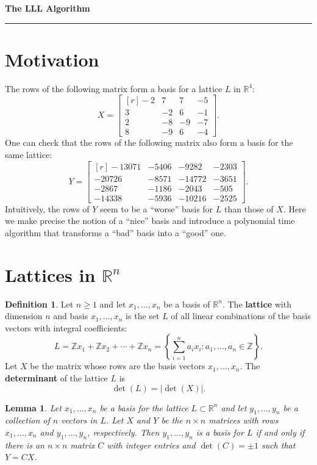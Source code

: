 \documentclass[11pt,letterpaper]{article}
\newcommand{\integers}{\mathbb{Z}}
\newcommand{\reals}{\mathbb{R}}
\newtheorem{lemma}{Lemma}[section]
\theoremstyle{definition}
\newtheorem{definition}{Definition}[section]
\begin{document}
\begin{center}
{\bf \Large The LLL Algorithm} %
\vspace{0.2cm}
\hrule
\end{center}
%	
\section{Motivation}
The rows of the following matrix form a basis for a lattice $L$ in $\reals^4$:
\[
X = \begin{bmatrix*}[r]
	-2 & 7 & 7 & -5\\
	3 & -2 & 6 & -1\\
	2 & -8 & -9 & -7\\
	8 & -9 & 6 & -4
\end{bmatrix*}.
\]
One can check that the rows of the following matrix also form a basis for the same lattice:
\[
Y = \begin{bmatrix*}[r]
	-13071 & -5406 & -9282 & -2303\\
	-20726 & -8571 & -14772 & -3651\\
	-2867 & -1186 & -2043 & -505\\
	-14338 & -5936 & -10216 & -2525
\end{bmatrix*}.
\]
Intuitively, the rows of $Y$ seem to be a ``worse'' basis for $L$ than those of $X$. Here we make precise the notion of a ``nice'' basis and introduce a polynomial time algorithm that transforms a ``bad'' basis into a ``good'' one. 

\section{Lattices in $\reals^n$}
\begin{definition}
	Let $n\geq 1$ and let $x_1, \ldots, x_n$ be a basis of $\reals^n$. The \textbf{lattice} with dimension $n$ and basis $x_1, \ldots, x_n$ is the set $L$ of all linear combinations of the basis vectors with integral coefficients:
	\[
	L = \integers x_1 + \integers x_2 + \cdots + \integers x_n = \left\{\sum_{i=1}^na_ix_i: a_1, \ldots, a_n\in \integers\right\}.
	\]
	Let $X$ be the matrix whose rows are the basis vectors $x_1, \ldots, x_n$. The \textbf{determinant} of the lattice $L$ is
	\[
	\det(L) = |\det(X)|.
	\]
\end{definition}

\begin{lemma}
	Let $x_1, \ldots, x_n$ be a basis for the lattice $L\subset \reals^n$ and let $y_1, \ldots, y_n$ be a collection of $n$ vectors in $L$. Let $X$ and $Y$ be the $n\times n$ matrices with rows $x_1, \ldots, x_n$ and $y_1, \ldots, y_n$, respectively. Then $y_1, \ldots, y_n$ is a basis for $L$ if and only if there is an $n\times n$ matrix $C$ with integer entries and $\det(C) = \pm 1$ such that $Y = CX$.
\end{lemma}
\end{document}
